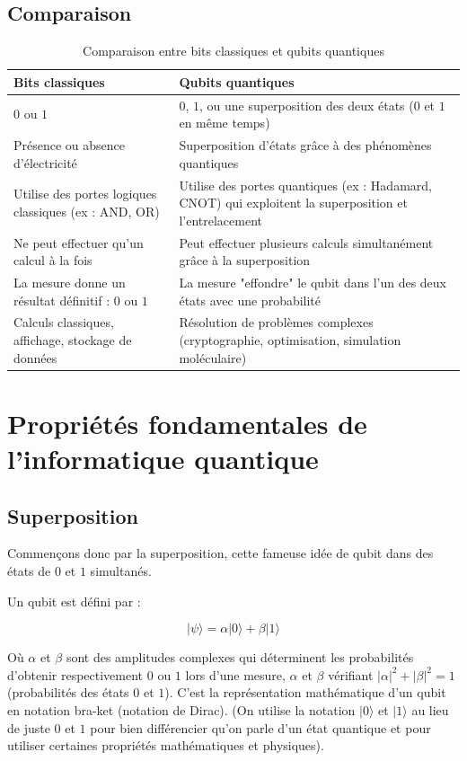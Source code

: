 \documentclass{article}
\begin{document}
\subsection{Comparaison}

\begin{table}[H]
\centering
\begin{tabularx}{\textwidth}{|X|X|}
  \hline
  \textbf{Bits classiques} & \textbf{Qubits quantiques} \\
  \hline
  $0$ ou $1$ & $0$, $1$, ou une superposition des deux états ($0$ et $1$ en même temps) \\
  \hline
  Présence ou absence d’électricité & Superposition d'états grâce à des phénomènes quantiques \\
  \hline
  Utilise des portes logiques classiques (ex : AND, OR) & Utilise des portes quantiques (ex : Hadamard, CNOT) qui exploitent la superposition et l'entrelacement \\
  \hline
  Ne peut effectuer qu'un calcul à la fois & Peut effectuer plusieurs calculs simultanément grâce à la superposition \\
  \hline
  La mesure donne un résultat définitif : $0$ ou $1$ & La mesure "effondre" le qubit dans l'un des deux états avec une probabilité \\
  \hline
  Calculs classiques, affichage, stockage de données & Résolution de problèmes complexes (cryptographie, optimisation, simulation moléculaire) \\
  \hline
\end{tabularx}
\caption{Comparaison entre bits classiques et qubits quantiques}
\end{table}



\break\section{Propriétés fondamentales de l'informatique quantique}
\subsection{Superposition}
Commençons donc par la superposition, cette fameuse idée de qubit dans des états de $0$ et $1$ simultanés.

Un qubit est défini par :

\[ |\psi\rangle = \alpha|0\rangle + \beta|1\rangle \]

Où $\alpha$ et $\beta$ sont des amplitudes complexes qui déterminent les probabilités d’obtenir respectivement $0$ ou $1$ lors d’une mesure, $\alpha$ et $\beta$ vérifiant $|\alpha|^2 + |\beta|^2 = 1$ (probabilités des états $0$ et $1$).\cite{evidenCorte2024} C’est la représentation mathématique d’un qubit en notation bra-ket (notation de Dirac). (On utilise la notation $|0\rangle$ et $|1\rangle$ au lieu de juste $0$ et $1$ pour bien différencier qu’on parle d’un état quantique et pour utiliser certaines propriétés mathématiques et physiques).
\end{document}
